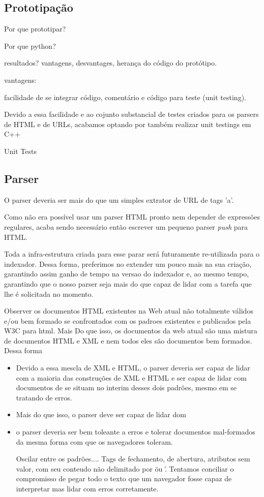 \documentclass[10pt,twocolumn]{article}
\begin{document}
\subsection{Prototipação}

Por que prototipar?

Por que python?

resultados? vantagens, desvantages, herança do código do protótipo.

vantagens:

facilidade de se integrar código, comentário e código para teste (unit testing).

Devido a essa facilidade e ao cojunto substancial de testes criados para os
parsers de HTML e de URLs, acabamos optando por também realizar unit testings
em C++

Unit Tests

\subsection{Parser}

O parser deveria ser mais do que um simples extrator de URL de tags 'a'.

Como não era possível usar um parser HTML pronto nem depender de expressões
regulares, acaba sendo necessário então escrever um pequeno parser \emph{push}
para HTML.

Toda a infra-estrutura criada para esse parar será futuramente re-utilizada
para o indexador. Dessa forma, preferimos no extender um pouco mais na sua
criação, garantindo assim ganho de tempo na versao do indexador e, ao mesmo
tempo, garantindo que o nosso parser seja mais do que capaz de lidar com a
tarefa que lhe é solicitada no momento.

Observer os documentos HTML existentes na Web atual não totalmente válidos e/ou
bem formado se confrontados com os padroes existentes e publicados pela W3C
para html. Mais Do que isso, os documentos da web atual são uma mistura de
documentos HTML e XML e nem todos eles são documentos bem formados. Dessa forma

\begin{itemize}

\item Devido a essa mescla de XML e HTML, o parser deveria ser capaz de lidar
com a maioria das construções de XML e HTML e ser capaz de lidar com documentos
de se situam no interim desses dois padrões, mesmo em se tratando de erros.

\item Mais do que isso, o parser deve ser capaz de lidar dom

\item o parser deveria ser bem toleante a erros e tolerar documentos
mal-formados da mesma forma com que os navegadores toleram. 

Oscilar entre os padrões.... Tags de fechamento, de abertura, atributos sem
valor, com seu conteudo não delimitado por \" ou \'. Tentamos conciliar o
compromisso de pegar todo o texto que um navegador fosse capaz de interpretar
mas lidar com erros corretamente.

\end{itemize}
\end{document}
